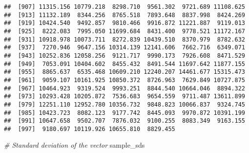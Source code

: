 \documentclass[]{article}
\newenvironment{Shaded}{\begin{snugshade}}{\end{snugshade}}
\newcommand{\CommentTok}[1]{\textcolor[rgb]{0.56,0.35,0.01}{\textit{#1}}}
\newcommand{\NormalTok}[1]{#1}
\begin{document}
\begin{verbatim}
##  [907] 11315.156 10779.218  8298.710  9561.302  9721.689 11108.625
##  [913] 11132.189  8344.256  8765.518  7893.648  8837.998  8424.269
##  [919] 10424.540  9492.857  9810.466  9916.872 11221.887  9119.013
##  [925]  8222.083  7995.050 11699.684  8431.400  9778.521 11172.167
##  [931] 10918.978 10073.711  8272.839 10439.510  8370.979  8782.632
##  [937]  7270.946  9647.156 10314.139 12141.606  7662.716  6349.071
##  [943] 10252.836 12058.256  9121.717  9990.173  7926.608  8471.529
##  [949]  7053.091 10404.602  8455.432  8491.544 11697.642 11877.155
##  [955]  8865.637  6535.468 10609.210 12240.207 14461.677 15315.473
##  [961]  9059.107 10161.925 10850.372  8726.963  7629.849 10727.875
##  [967] 10464.923  9319.524  9993.251  8844.540 10664.046  8894.322
##  [973] 10293.428 10205.872  7536.683  9654.559  9711.487 13611.899
##  [979] 12251.110 12952.780 10356.732  9848.823 10066.837  9324.745
##  [985] 10423.723  8082.123  9177.742  8445.093  9970.872 10391.199
##  [991] 10647.658  9502.707  7876.032  9100.255  8083.349  9163.155
##  [997]  9180.697 10119.926 10655.810  8829.455
\end{verbatim}

\begin{Shaded}
\begin{Highlighting}[]
\CommentTok{# Standard deviation of the vector}
\NormalTok{sample_sds}
\end{Highlighting}
\end{Shaded}
\end{document}
